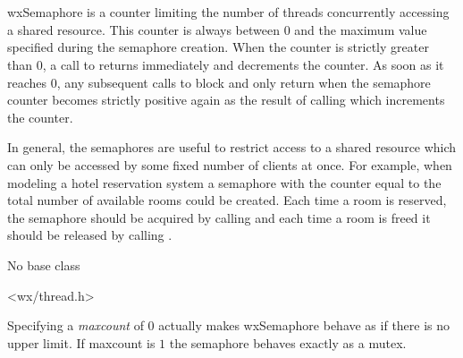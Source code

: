 
\section{}\label{wxsemaphore}

wxSemaphore is a counter limiting the number of threads concurrently accessing
a shared resource. This counter is always between $0$ and the maximum value
specified during the semaphore creation. When the counter is strictly greater
than $0$, a call to  returns immediately and
decrements the counter. As soon as it reaches $0$, any subsequent calls to
 block and only return when the semaphore
counter becomes strictly positive again as the result of calling 
 which increments the counter.

In general, the semaphores are useful to restrict access to a shared resource
which can only be accessed by some fixed number of clients at once. For
example, when modeling a hotel reservation system a semaphore with the counter
equal to the total number of available rooms could be created. Each time a room
is reserved, the semaphore should be acquired by calling 
 and each time a room is freed it should be
released by calling .


No base class


<wx/thread.h>


\label{wxsemaphorewxsemaphore}


Specifying a {\it maxcount} of $0$ actually makes wxSemaphore behave as if
there is no upper limit. If maxcount is $1$ the semaphore behaves exactly as a
mutex.

